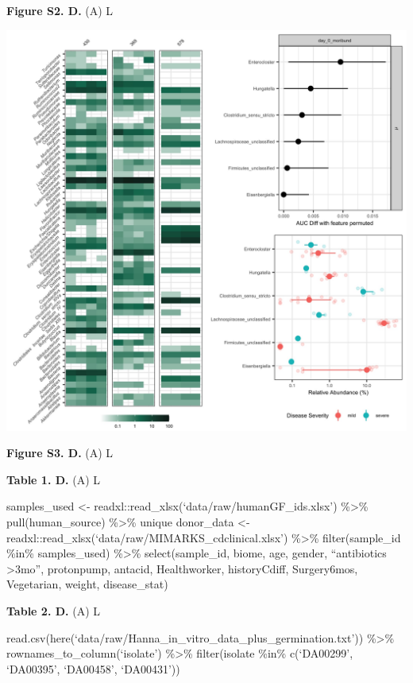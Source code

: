 \documentclass[
  12pt,
]{article}
\begin{document}
\textbf{Figure S2. D.} (A) L

\hfill\break

\includegraphics{../results/figures/figure_S3.jpg}

\textbf{Figure S3. D.} (A) L

\hfill\break

\textbf{Table 1. D.} (A) L

samples\_used \textless-
readxl::read\_xlsx(`data/raw/humanGF\_ids.xlsx') \%\textgreater\%
pull(human\_source) \%\textgreater\% unique donor\_data \textless-
readxl::read\_xlsx(`data/raw/MIMARKS\_cdclinical.xlsx') \%\textgreater\%
filter(sample\_id \%in\% samples\_used) \%\textgreater\%
select(sample\_id, biome, age, gender, ``antibiotics \textgreater3mo'',
protonpump, antacid, Healthworker, historyCdiff, Surgery6mos,
Vegetarian, weight, disease\_stat)

\textbf{Table 2. D.} (A) L

read.csv(here(`data/raw/Hanna\_in\_vitro\_data\_plus\_germination.txt'))
\%\textgreater\% rownames\_to\_column(`isolate') \%\textgreater\%
filter(isolate \%in\% c(`DA00299', `DA00395', `DA00458', `DA00431'))
\end{document}
